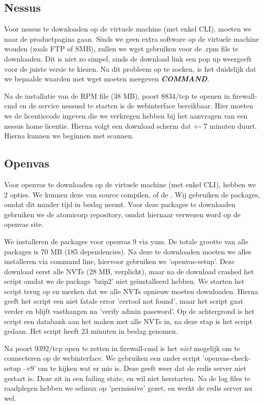 \subsection{Nessus}

Voor nessus te downloaden op de virtuele machine (met enkel CLI), moeten we naar de productpagina gaan. Sinds we geen extra software op de virtuele machine wouden (zoals FTP of SMB), zullen we wget gebruiken voor de .rpm file te downloaden. Dit is niet zo simpel, sinds de download link een pop up weergeeft voor de juiste versie te kiezen. Na dit probleem op te zoeken, is het duidelijk dat we bepaalde waarden met wget moeten meegeven \textbf{\textit{COMMAND}}.

Na de installatie van de RPM file (38 MB), poort 8834/tcp te openen in firewall-cmd en de service nessusd te starten is de webinterface bereikbaar. Hier moeten we de licentiecode ingeven die we verkregen hebben bij het aanvragen van een nessus home licentie. Hierna volgt een download scherm dat +- 7 minuten duurt. Hierna kunnen we beginnen met scannen.

\subsection{Openvas}

Voor openvas te downloaden op de virtuele machine (met enkel CLI), hebben we 2 opties. We kunnen deze van source compilen, of de \textcite{Openvas-installation}. Wij gebruiken de packages, omdat dit minder tijd in beslag neemt. Voor deze packages te downloaden gebruiken we de atomicorp repository, omdat hiernaar verwezen word op de openvas site.

We installeren de packages voor openvas 9 via yum. De totale grootte van alle packages is 70 MB (185 dependencies). Na deze te downloaden moeten we alles installeren via command line, hiervoor gebruiken we 'openvas-setup'. Deze download eerst alle NVTs (28 MB, verplicht), maar na de download crashed het script omdat we de package 'bzip2' niet geïnstalleerd hebben. We starten het script terug op en merken dat we alle NVTs opnieuw moeten downloaden. Hierna geeft het script een niet fatale error 'certool not found', maar het script gaat verder en blijft vasthangen na 'verify admin password'. Op de achtergrond is het script een databank aan het maken met alle NVTs in, na deze stap is het script gedaan. Het script heeft 23 minuten in beslag genomen.

Na poort 9392/tcp open te zetten in firewall-cmd is het \textit{niet} mogelijk om te connecteren op de webinterface. We gebruiken een ander script 'openvas-check-setup --v9' om te kijken wat er mis is. Deze geeft weer dat de redis server niet gestart is. Deze zit in een failing state, en wil niet herstarten. Na de log files te raadplegen hebben we selinux op 'permissive' gezet, en werkt de redis server nu wel.

